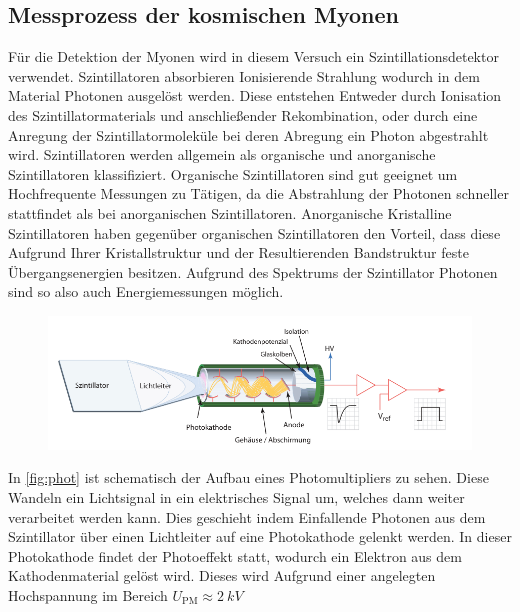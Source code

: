 \subsection{Messprozess der kosmischen Myonen}
Für die Detektion der Myonen wird in diesem Versuch ein Szintillationsdetektor verwendet. Szintillatoren absorbieren Ionisierende Strahlung wodurch in dem Material Photonen ausgelöst werden. Diese entstehen Entweder durch Ionisation des Szintillatormaterials und anschließender Rekombination, oder 
durch eine Anregung der Szintillatormoleküle bei deren Abregung ein Photon abgestrahlt wird. Szintillatoren werden allgemein als organische und anorganische Szintillatoren klassifiziert. Organische Szintillatoren sind gut geeignet um Hochfrequente Messungen zu Tätigen, da die Abstrahlung der Photonen schneller stattfindet als bei anorganischen Szintillatoren. Anorganische Kristalline Szintillatoren haben gegenüber organischen Szintillatoren den Vorteil, dass diese Aufgrund Ihrer Kristallstruktur und der Resultierenden Bandstruktur feste Übergangsenergien besitzen. Aufgrund des Spektrums der Szintillator Photonen sind so also auch Energiemessungen
möglich. 

\begin{figure}[H]
    \centering
    \includegraphics[width=0.8\linewidth]{data/photomult.png}
    \label{fig:phot}
\end{figure}
\noindent
In \autoref{fig:phot} ist schematisch der Aufbau eines Photomultipliers zu sehen. Diese Wandeln ein Lichtsignal in ein elektrisches Signal um, welches dann weiter verarbeitet werden kann. Dies geschieht indem Einfallende Photonen aus dem Szintillator über einen Lichtleiter auf eine Photokathode gelenkt werden. In dieser Photokathode findet der
Photoeffekt statt, wodurch ein Elektron aus dem Kathodenmaterial gelöst wird. Dieses wird Aufgrund einer angelegten Hochspannung im Bereich $U_{\text{PM}} \approx \SI{2}{kV}$
\newpage


